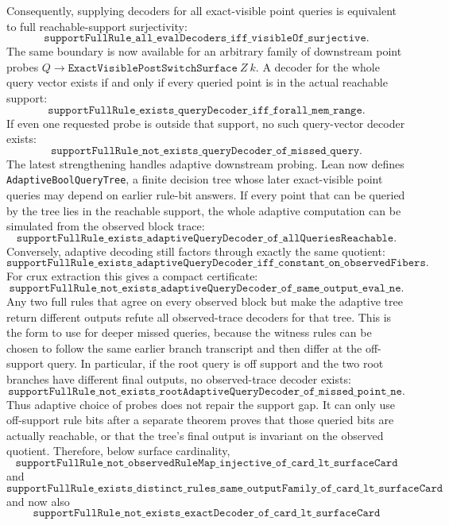 \documentclass[11pt]{article}
\theoremstyle{remark}
\begin{document}
Consequently, supplying decoders for all exact-visible point queries is
equivalent to full reachable-support surjectivity:
\[
  \texttt{supportFullRule\_all\_evalDecoders\_iff\_visibleOf\_surjective}.
\]
The same boundary is now available for an arbitrary family of downstream
point probes \(Q\to\texttt{ExactVisiblePostSwitchSurface}\ Z\ k\).  A decoder
for the whole query vector exists if and only if every queried point is in the
actual reachable support:
\[
  \texttt{supportFullRule\_exists\_queryDecoder\_iff\_forall\_mem\_range}.
\]
If even one requested probe is outside that support, no such query-vector
decoder exists:
\[
  \texttt{supportFullRule\_not\_exists\_queryDecoder\_of\_missed\_query}.
\]
The latest strengthening handles adaptive downstream probing.  Lean now defines
\texttt{AdaptiveBoolQueryTree}, a finite decision tree whose later
exact-visible point queries may depend on earlier rule-bit answers.  If every
point that can be queried by the tree lies in the reachable support, the whole
adaptive computation can be simulated from the observed block trace:
\[
  \texttt{supportFullRule\_exists\_adaptiveQueryDecoder\_of\_allQueriesReachable}.
\]
Conversely, adaptive decoding still factors through exactly the same quotient:
\[
  \texttt{supportFullRule\_exists\_adaptiveQueryDecoder\_iff\_constant\_on\_observedFibers}.
\]
For crux extraction this gives a compact certificate:
\[
  \texttt{supportFullRule\_not\_exists\_adaptiveQueryDecoder\_of\_same\_output\_eval\_ne}.
\]
Any two full rules that agree on every observed block but make the adaptive tree
return different outputs refute all observed-trace decoders for that tree.  This
is the form to use for deeper missed queries, because the witness rules can be
chosen to follow the same earlier branch transcript and then differ at the
off-support query.
In particular, if the root query is off support and the two root branches have
different final outputs, no observed-trace decoder exists:
\[
  \texttt{supportFullRule\_not\_exists\_rootAdaptiveQueryDecoder\_of\_missed\_point\_ne}.
\]
Thus adaptive choice of probes does not repair the support gap.  It can only
use off-support rule bits after a separate theorem proves that those queried
bits are actually reachable, or that the tree's final output is invariant on
the observed quotient.
Therefore, below surface cardinality,
\[
  \texttt{supportFullRule\_not\_observedRuleMap\_injective\_of\_card\_lt\_surfaceCard}
\]
and
\[
  \texttt{supportFullRule\_exists\_distinct\_rules\_same\_outputFamily\_of\_card\_lt\_surfaceCard}
\]
and now also
\[
  \texttt{supportFullRule\_not\_exists\_exactDecoder\_of\_card\_lt\_surfaceCard}
\]
\end{document}
